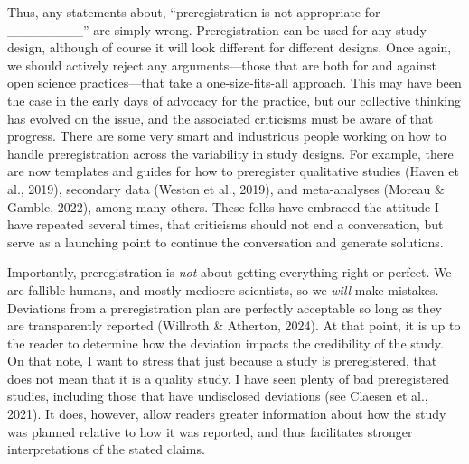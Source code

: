 \documentclass[authordate, empirical,issue]{jote-new-article}
\begin{document}







Thus, any statements about, “preregistration is not appropriate for \_\_\_\_\_\_\_\_” are simply wrong. Preregistration can be used for any study design, although of course it will look different for different designs. Once again, we should actively reject any arguments—those that are both for and against open science practices—that take a one-size-fits-all approach. This may have been the case in the early days of advocacy for the practice, but our collective thinking has evolved on the issue, and the associated criticisms must be aware of that progress. There are some very smart and industrious people working on how to handle preregistration across the variability in study designs. For example, there are now templates and guides for how to preregister qualitative studies (Haven et al., 2019), secondary data (Weston et al., 2019), and meta-analyses  (Moreau \& Gamble, 2022), among many others. These folks have embraced the attitude I have repeated several times, that criticisms should not end a conversation, but serve as a launching point to continue the conversation and generate solutions.







Importantly, preregistration is \emph{not} about getting everything right or perfect. We are fallible humans, and mostly mediocre scientists, so we \emph{will} make mistakes. Deviations from a preregistration plan are perfectly acceptable so long as they are transparently reported (Willroth \& Atherton, 2024). At that point, it is up to the reader to determine how the deviation impacts the credibility of the study. On that note, I want to stress that just because a study is preregistered, that does not mean that it is a quality study. I have seen plenty of bad preregistered studies, including those that have undisclosed deviations (see Claesen et al., 2021). It does, however, allow readers greater information about how the study was planned relative to how it was reported, and thus facilitates stronger interpretations of the stated claims.
\end{document}
